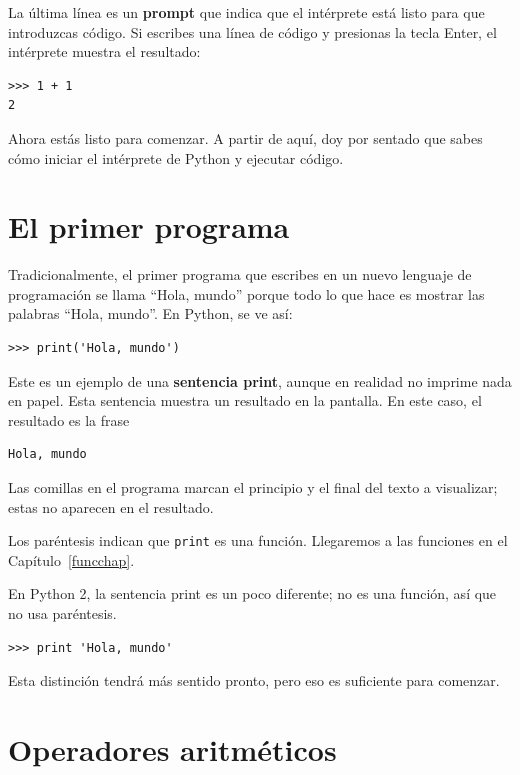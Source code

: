 \documentclass[10pt]{book}
\begin{document}
La última línea es un {\bf prompt} que indica que el intérprete está listo
para que introduzcas código.
Si escribes una línea de código y presionas la tecla Enter, el intérprete
muestra el resultado:

\begin{verbatim}
>>> 1 + 1
2
\end{verbatim}
%
Ahora estás listo para comenzar.
A partir de aquí, doy por sentado que sabes cómo iniciar el intérprete de Python
y ejecutar código.


\section{El primer programa}
\label{hello}

Tradicionalmente, el primer programa que escribes en un nuevo lenguaje
de programación se llama ``Hola, mundo'' porque todo lo que hace es mostrar
las palabras ``Hola, mundo''.  En Python, se ve así:

\begin{verbatim}
>>> print('Hola, mundo')
\end{verbatim}
%
Este es un ejemplo de una {\bf sentencia print}, aunque
en realidad no imprime nada en papel.  Esta sentencia muestra un resultado en la
pantalla.  En este caso, el resultado es la frase

\begin{verbatim}
Hola, mundo
\end{verbatim}
%
Las comillas en el programa marcan el principio y el final
del texto a visualizar; estas no aparecen en el resultado.

Los paréntesis indican que {\tt print} es una función.  Llegaremos
a las funciones en el Capítulo~\ref{funcchap}.
 

En Python 2, la sentencia print es un poco diferente; no es
una función, así que no usa paréntesis.

\begin{verbatim}
>>> print 'Hola, mundo'
\end{verbatim}
%
Esta distinción tendrá más sentido pronto, pero eso es suficiente para
comenzar.


\section{Operadores aritméticos}
\end{document}

